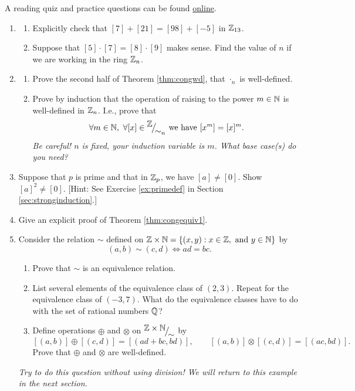 \begin{exercises}{}{}
	A reading quiz and practice questions can be found \href{http://www.math.uci.edu/~ndonalds/math13/selftest/7-4-welldefn.html}{online}.

\begin{enumerate}
  \item\begin{enumerate}
    \item Explicitly check that $[7]+[21]=[98]+[-5]$ in $\mathbb{Z}_{13}$.
    \item Suppose that $[5]\cdot[7]=[8]\cdot[9]$ makes sense. Find the value of $n$ if we are working in the ring $\mathbb{Z}_n$.
  \end{enumerate}
  
  \item\begin{enumerate}
    \item Prove the second half of Theorem \ref{thm:congwd}, that $\cdot_n$ is well-defined.
	  \item Prove by induction that the operation of raising to the power $m\in\mathbb{N}$ is well-defined in $\mathbb{Z}_n$. I.e., prove that
  \[\forall m\in\mathbb{N},\ \forall [x]\in{}^{\textstyle {\mathbb{Z}}}\!\big/_{\textstyle \!{\sim_n}}\text{ we have } [x^m]=[x]^m.\]
  \emph{Be careful! $n$ is fixed, your induction variable is $m$. What base case(s) do you need?}
  \end{enumerate} 
  
  
  
  \item Suppose that $p$ is prime and that in $\mathbb{Z}_p$, we have $[a] \neq [0]$. Show $[a]^2 \neq [0]$. [Hint: See Exercise \ref{ex:primedef} in Section \ref{sec:stronginduction}.]
  
  \item Give an explicit proof of Theorem \ref{thm:congequiv1}.
  
  \item\label{ex:qequiv} Consider the relation $\sim$ defined on $\mathbb{Z}\times\mathbb{N}=\{(x,y):x\in\mathbb{Z},\text{ and }y\in\mathbb{N}\}$ by
  \[(a,b)\sim(c,d)\iff ad=bc.\]
  \begin{enumerate}
    \item Prove that $\sim$ is an equivalence relation.
    \item List several elements of the equivalence class of $(2,3)$. Repeat for the equivalence class of $(-3,7)$. What do the equivalence classes have to do with the set of rational numbers $\mathbb{Q}$?
    \item Define operations $\oplus$ and $\otimes$ on ${}^{\textstyle {\mathbb{Z}\times\mathbb{N}}}\!\big/_{\textstyle \!{\sim}}$ by
    \[[(a,b)]\oplus[(c,d)]=[(ad+bc,bd)],\qquad [(a,b)]\otimes[(c,d)]=[(ac,bd)].\]
    Prove that $\oplus$ and $\otimes$ are well-defined.
  \end{enumerate}
  \emph{Try to do this question \emph{without} using division! We will return to this example in the next section.}



\end{enumerate}
\end{exercises}
